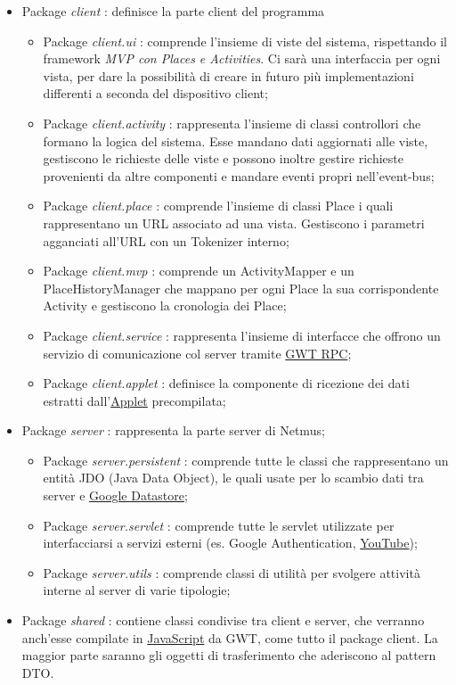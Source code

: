 \begin{itemize}
  \item Package \emph{client} : definisce la parte client del programma
  \begin {itemize}
    \item Package \emph{client.ui} : comprende l'insieme di viste del sistema,
    rispettando il framework \emph{MVP con Places e Activities}. Ci sar\`a una
    interfaccia per ogni vista, per dare la possibilit\`a di creare in futuro
    pi\`u implementazioni differenti a seconda del dispositivo client;
    \item Package \emph{client.activity} : rappresenta l'insieme di classi
    controllori che formano la logica del sistema. Esse mandano dati aggiornati alle
    viste, gestiscono le richieste delle viste e possono inoltre gestire
    richieste provenienti da altre componenti e mandare eventi propri nell'event-bus;
    \item Package \emph{client.place} : comprende l'insieme di classi Place i
    quali rappresentano un URL associato ad una vista. Gestiscono i parametri
    agganciati all'URL con un Tokenizer interno;
    \item Package \emph{client.mvp} : comprende un ActivityMapper e
    un PlaceHistoryManager che mappano per ogni Place la sua corrispondente
    Activity e gestiscono la cronologia dei Place;
    \item Package \emph{client.service} : rappresenta l'insieme di interfacce
    che offrono un servizio di comunicazione col server tramite \underline{GWT
    RPC};
    \item Package \emph{client.applet} : definisce la componente di
    ricezione dei dati estratti dall'\underline{Applet} precompilata;
  \end {itemize}
  \item Package \emph{server} : rappresenta la parte server di Netmus;
  \begin{itemize}
    \item Package \emph{server.persistent} : comprende tutte le classi che
    rappresentano un entit\`a JDO (Java Data Object), le quali usate per lo scambio dati tra
    server e \underline{Google Datastore};
    \item Package \emph{server.servlet} : comprende tutte le servlet utilizzate
    per interfacciarsi a servizi esterni (es. Google Authentication,
    \underline{YouTube});
    \item Package \emph{server.utils} : comprende classi di utilit\`a per
    svolgere attivit\`a interne al server di varie tipologie;
  \end{itemize}
  \item Package \emph{shared} :  contiene classi condivise tra client e server,
  che verranno anch'esse compilate in \underline{JavaScript} da GWT, come tutto
  il package client. La maggior parte saranno gli oggetti di trasferimento che
  aderiscono al pattern DTO.
\end{itemize}

